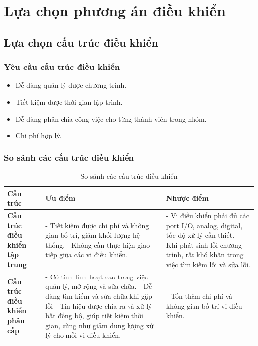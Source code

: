        \section{Lựa chọn phương án điều khiển}
            \subsection{Lựa chọn cấu trúc điều khiển}
                \subsubsection{Yêu cầu cấu trúc điều khiển}
                    \begin{itemize}
                        \item Dễ dàng quản lý được chương trình. 
                        \item Tiết kiệm được thời gian lập trình. 
                        \item Dễ dàng phân chia công việc cho từng thành viên trong nhóm.
                        \item Chi phí hợp lý. 
                    \end{itemize}
                \subsubsection{So sánh các cấu trúc điều khiển}
                \begin{table}[H]
                    \centering
                    \begin{tabular}{|p{3cm}|p{4cm}|p{4cm}|}
                        \hline
                        \textbf{Cấu trúc} & \textbf{Ưu điểm} & \textbf{Nhược điểm} \\
                        \hline
                        \textbf{Cấu trúc điều khiển tập trung} & 
                        - Tiết kiệm được chi phí và không gian bố trí, giảm khối lượng hệ thống.\newline
                        - Không cần thực hiện giao tiếp giữa các vi điều khiển. & 
                        - Vi điều khiển phải đủ các port I/O, analog, digital, tốc độ xử lý cần thiết. \newline
                        - Khi phát sinh lỗi chương trình, rất khó khăn trong việc tìm kiếm lỗi và sửa lỗi.  \\ 
                        \hline
                        \textbf{Cấu trúc điều khiển phân cấp} & 
                        - Có tính linh hoạt cao trong việc quản lý, mở rộng và sửa chữa. \newline
                        - Dễ dàng tìm kiếm và sửa chữa khi gặp lỗi \newline
                        - Tín hiệu được chia ra và xử lý bất đồng bộ, giúp tiết kiệm thời gian, cũng như giảm dung lượng xử lý cho mỗi vi điều khiển. & 
                        - Tốn thêm chi phí và không gian bố trí vi điều khiển. \\
                        \hline
                        \end{tabular}
                    \caption{So sánh các cấu trúc điều khiển}
                    \label{tab:compare_control_structures}  
                \end{table}
